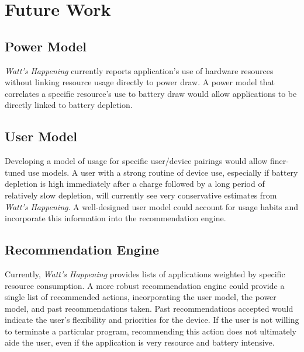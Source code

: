 \section*{Future Work}
\label{sec:future}
\subsection*{Power Model}
\emph{Watt's Happening} currently reports application's use of hardware resources without linking resource usage directly to power draw.
A power model that correlates a specific resource's use to battery draw would allow applications to be directly linked to battery depletion.

\subsection*{User Model}
Developing a model of usage for specific user/device pairings would allow finer-tuned use models.
A user with a strong routine of device use, especially if battery depletion is high immediately after a charge followed by a long period of relatively slow depletion, will currently see very conservative estimates from \emph{Watt's Happening}. 
A well-designed user model could account for usage habits and incorporate this information into the recommendation engine.

\subsection*{Recommendation Engine}
Currently, \emph{Watt's Happening} provides lists of applications weighted by specific resource consumption.
A more robust recommendation engine could provide a single list of recommended actions, incorporating the user model, the power model, and past recommendations taken.
Past recommendations accepted would indicate the user's flexibility and priorities for the device.
If the user is not willing to terminate a particular program, recommending this action does not ultimately aide the user, even if the application is very resource and battery intensive.


